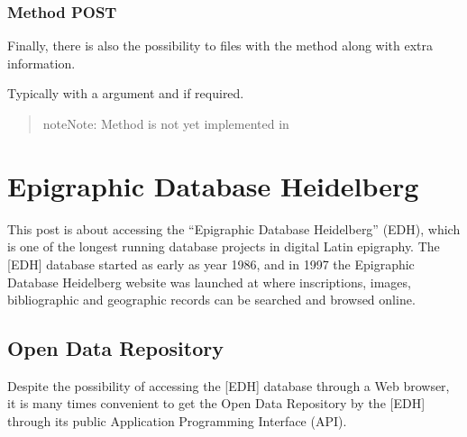 \documentclass[a4paper,12pt,english]{sphinxhowto}
\begin{document}
\subsubsection{Method POST}
\label{\detokenize{Sciencedata_dk:method-post}}
Finally, there is also the possibility to  files with the  method along with extra
information.

\begin{sphinxVerbatim}[commandchars=\\\{\},formatcom=\footnotesize]
   
\end{sphinxVerbatim}

Typically with a  argument and  if required.
\begin{quote}

\begin{sphinxadmonition}{note}{Note:}
Method  is not yet implemented in 
\end{sphinxadmonition}
\end{quote}



\section{Epigraphic Database Heidelberg}
\label{\detokenize{Epigraphic:epigraphic-database-heidelberg}}\label{\detokenize{Epigraphic:edh}}\label{\detokenize{Epigraphic::doc}}
This post is about accessing the “Epigraphic Database Heidelberg” (EDH),
which is one of the longest running database projects in digital Latin
epigraphy. The {[}EDH{]} database started as early as year 1986, and in 1997 the Epigraphic
Database Heidelberg website was launched at
 where inscriptions, images,
bibliographic and geographic records can be searched and browsed online.


\subsection{Open Data Repository}
\label{\detokenize{Epigraphic:open-data-repository}}
Despite the possibility of accessing the {[}EDH{]} database through a Web browser, it is
many times convenient to get the Open Data Repository by the
{[}EDH{]} through its
public Application Programming Interface (API).
\end{document}
